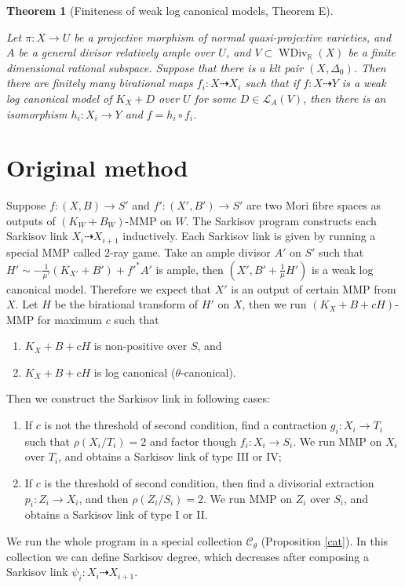 \documentclass[11pt]{amsart}
\newtheorem{thm}[defn]{Theorem}
\begin{document}
\begin{thm}[Finiteness of weak log canonical models, \cite{BCHM10} Theorem E]\label{finitewlcm}

   Let $\pi:X\to U$ be a projective morphism of normal quasi-projective varieties, and $A$ be a general divisor relatively ample over $U$, and $V \subset \operatorname{WDiv}_{\mathbb{R}}(X)$ be a finite dimensional rational subspace. Suppose that there is a klt pair $(X,\Delta_{0})$. Then there are finitely many birational maps $f_{i}:X \dashrightarrow X_{i}$ such that if $f:X \dashrightarrow  Y$ is a weak log canonical model of $K_{X}+D$ over $U$ for some $D \in \mathcal{L}_{A}(V)$, then there is an isomorphism  $h_{i}:X_{i} \to Y$  and $f=h_{i}\circ f_{i}$.  

\end{thm}


\section{Original method}
Suppose $f:(X,B)\to S'$ and $f':(X',B')\to S'$ are two Mori fibre spaces as outputs of $(K_{W}+B_{W})$-MMP on $W$. The Sarkisov program constructs each Sarkisov link $X_{i}\dashrightarrow X_{i+1}$ inductively. Each Sarkisov link is given by running a special MMP called 2-ray game. Take an ample divisor $A'$ on $S'$ such that $H'\sim -\frac{1}{\mu'}(K_{X'}+B') +f'^*A'$  is ample, then $(X',B'+\frac{1}{\mu}H')$ is a weak log canonical model. Therefore we expect that $X'$ is an output of certain MMP from $X$. Let $H$ be the birational transform of $H'$ on $X$, then we run $(K_{X}+B+cH)$-MMP for maximum  $c$ such that
\begin{enumerate}
  \item $K_{X}+B+cH$ is non-positive over $S$, and 
  \item $K_{X}+B+cH$ is log canonical ($\theta$-canonical).
\end{enumerate}
Then we construct the Sarkisov link in following cases:
\begin{enumerate}
  \item If $c$ is not the threshold of second condition, find a contraction $g_{i}:X_{i} \to T_{i}$ such that $\rho(X_{i}/T_{i})=2$ and factor though $f_{i}:X_{i} \to S_{i}$.  We run MMP on  $X_{i} $ over $T_{i}$, and obtains a Sarkisov link of type III or IV;
  \item If $c$ is the threshold of second condition, then find a divisorial extraction $p_{i}:Z_{i}\to X_{i}$, and then $\rho(Z_{i}/S_{i})=2$.  We run MMP on $Z_{i}$ over $S_{i}$, and obtains a Sarkisov link of type I or II. 
\end{enumerate}
We run the whole program in a special collection $\mathcal{C}_{\theta}$ (Proposition \ref{cat}). In this collection we can define Sarkisov degree, which decreases after composing a Sarkisov link $\psi_{i}:X_{i}\dashrightarrow X_{i+1}$.
\end{document}
